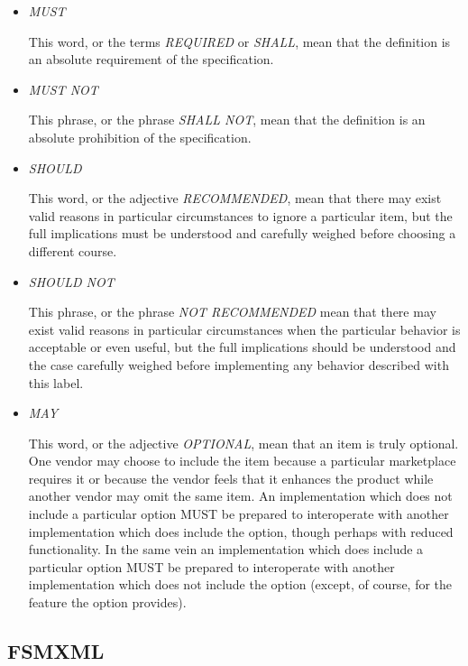 \documentclass[a4paper]{article}
\begin{document}
\begin{itemize}
\item \emph{MUST}

  This word, or the terms \emph{REQUIRED} or \emph{SHALL}, mean that
  the definition is an absolute requirement of the specification.

\item \emph{MUST NOT}

  This phrase, or the phrase \emph{SHALL NOT}, mean that the
  definition is an absolute prohibition of the specification.

\item \emph{SHOULD}

  This word, or the adjective \emph{RECOMMENDED}, mean that there may
  exist valid reasons in particular circumstances to ignore a
  particular item, but the full implications must be understood and
  carefully weighed before choosing a different course.

\item \emph{SHOULD NOT}

  This phrase, or the phrase \emph{NOT RECOMMENDED} mean that there
  may exist valid reasons in particular circumstances when the
  particular behavior is acceptable or even useful, but the full
  implications should be understood and the case carefully weighed
  before implementing any behavior described with this label.

\item \emph{MAY}

  This word, or the adjective \emph{OPTIONAL}, mean that an item is
  truly optional.  One vendor may choose to include the item because a
  particular marketplace requires it or because the vendor feels that
  it enhances the product while another vendor may omit the same item.
  An implementation which does not include a particular option MUST be
  prepared to interoperate with another implementation which does
  include the option, though perhaps with reduced functionality. In
  the same vein an implementation which does include a particular
  option MUST be prepared to interoperate with another implementation
  which does not include the option (except, of course, for the
  feature the option provides).

\end{itemize}

\subsection{FSMXML}
\end{document}
